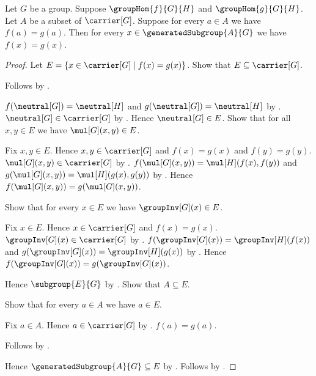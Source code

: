 \begin{theorem}\label{group_hom_agreement_on_generated_subgroup}
    Let $G$ be a group.
    Suppose $\groupHom{f}{G}{H}$ and $\groupHom{g}{G}{H}$.
    Let $A$ be a subset of $\carrier[G]$.
    Suppose for every $a\in A$ we have $f(a)=g(a)$.
    Then for every $x\in\generatedSubgroup{A}{G}$ we have
        $f(x)=g(x)$.
\end{theorem}
\begin{proof}
    Let $E=\{x\in\carrier[G]\mid f(x)=g(x)\}$.
    Show that $E\subseteq\carrier[G]$.
    \begin{subproof}
        Follows by .
    \end{subproof}
    $f(\neutral[G])=\neutral[H]$ and
        $g(\neutral[G])=\neutral[H]$ by
        .
    $\neutral[G]\in\carrier[G]$ by
        .
    Hence $\neutral[G]\in E$.
    Show that for all $x,y\in E$ we have $\mul[G](x,y)\in E$.
    \begin{subproof}
        Fix $x,y\in E$.
        Hence $x,y\in\carrier[G]$ and
            $f(x)=g(x)$ and $f(y)=g(y)$.
        $\mul[G](x,y)\in\carrier[G]$ by
            .
        $f(\mul[G](x,y))=\mul[H](f(x),f(y))$ and
            $g(\mul[G](x,y))=\mul[H](g(x),g(y))$ by
            .
        Hence $f(\mul[G](x,y))=g(\mul[G](x,y))$.
    \end{subproof}
    Show that for every $x\in E$ we have $\groupInv[G](x)\in E$.
    \begin{subproof}
        Fix $x\in E$.
        Hence $x\in\carrier[G]$ and $f(x)=g(x)$.
        $\groupInv[G](x)\in\carrier[G]$ by
            .
        $f(\groupInv[G](x))=\groupInv[H](f(x))$ and
            $g(\groupInv[G](x))=\groupInv[H](g(x))$ by
            .
        Hence $f(\groupInv[G](x))=g(\groupInv[G](x))$.
    \end{subproof}
    Hence $\subgroup{E}{G}$ by .
    Show that $A\subseteq E$.
    \begin{subproof}
        Show that for every $a\in A$ we have $a\in E$.
        \begin{subproof}
            Fix $a\in A$.
            Hence $a\in\carrier[G]$ by .
            $f(a)=g(a)$.
        \end{subproof}
        Follows by .
    \end{subproof}
    Hence $\generatedSubgroup{A}{G}\subseteq E$ by
        .
    Follows by .
\end{proof}

